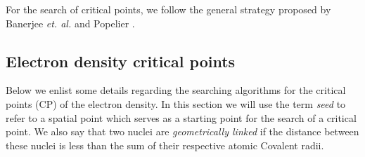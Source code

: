 For the search of critical points, we follow the general strategy proposed by Banerjee \textit{et. al.} \cite{bib:banerjee1985} and Popelier \cite{bib:popelier1994}.

\subsection{Electron density critical points}

Below we enlist some details regarding the searching algorithms for the critical points (CP)
of the electron density. In this section we will use the term \textit{seed} to refer to a
spatial point which serves as a starting point for the search of a critical point. We also
say that two nuclei are \textit{geometrically linked} if the distance between these nuclei
is less than the sum of their respective atomic Covalent radii.

